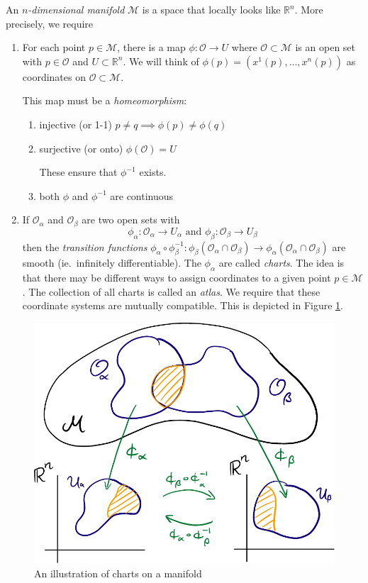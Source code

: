\begin{definition}[]
An \emph{$n$-dimensional manifold} $\mathcal{M}$ is a space that locally looks like $\mathbb{R}^n$.
More precisely, we require
\begin{enumerate}
  \item For each point $p \in \mathcal{M}$, there is a map $\phi \colon \mathcal{O} \to U$ where $\mathcal{O} \subset \mathcal{M}$ is an open set with $p \in \mathcal{O}$ and $U \subset \mathbb{R}^n$.
    We will think of $\phi(p) = (x^1(p), \dots, x^n(p))$ as coordinates on $\mathcal{O} \subset \mathcal{M}$.

    This map must be a \emph{homeomorphism}:
    \begin{enumerate}
      \item injective (or 1-1) $p \neq q \implies \phi(p) \neq \phi(q)$
      \item surjective (or onto) $\phi(\mathcal{O}) = U$\par
	These ensure that $\phi^{-1}$ exists.
      \item both $\phi$ and $\phi^{-1}$ are continuous
    \end{enumerate}
  \item If $\mathcal{O}_\alpha$ and $\mathcal{O}_\beta$ are two open sets with 
    \begin{equation}
      \phi_\alpha: \mathcal{O}_\alpha \to U_\alpha \text{ and } \phi_\beta: \mathcal{O}_\beta \to U_\beta
    \end{equation}
    then the \emph{transition functions} $\phi_\alpha \circ \phi^{-1}_\beta: \phi_\beta(\mathcal{O}_\alpha \cap \mathcal{O}_{\beta}) \to \phi_\alpha (\mathcal{O}_\alpha \cap \mathcal{O}_\beta)$ are smooth (ie.~infinitely differentiable).
    The $\phi_\alpha$ are called \emph{charts}. The idea is that there may be different ways to assign coordinates to a given point $p \in \mathcal{M}$.
    The collection of all charts is called an \emph{atlas}.
    We require that these coordinate systems are mutually compatible. This is depicted in Figure \ref{fig:manifold}.
\end{enumerate}
\end{definition}

\begin{figure}[tbhp]
  \centering
  \includegraphics[width=0.5\linewidth]{lectures/F1.pdf}
  \caption{An illustration of charts on a manifold}
  \label{fig:manifold}
\end{figure}

